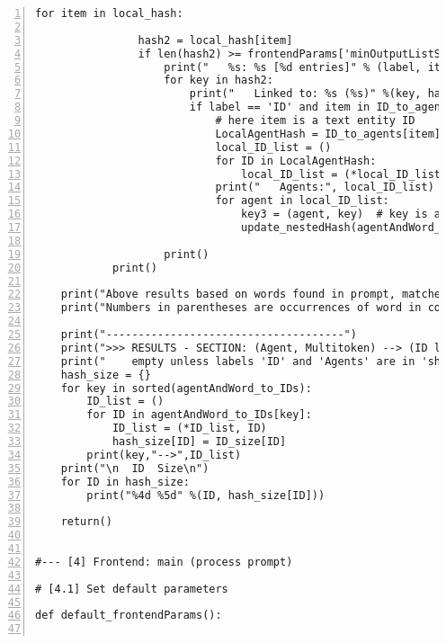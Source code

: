 \documentclass[10pt]{article}
\begin{document}
{\begin{lstlisting}[numbers=left,basicstyle=\ttfamily\footnotesize]
            for item in local_hash:

                hash2 = local_hash[item]
                if len(hash2) >= frontendParams['minOutputListSize']:
                    print("   %s: %s [%d entries]" % (label, item, len(hash2))) 
                    for key in hash2:
                        print("   Linked to: %s (%s)" %(key, hash2[key]))
                        if label == 'ID' and item in ID_to_agents: 
                            # here item is a text entity ID
                            LocalAgentHash = ID_to_agents[item]
                            local_ID_list = ()
                            for ID in LocalAgentHash:
                                local_ID_list = (*local_ID_list, ID)
                            print("   Agents:", local_ID_list)
                            for agent in local_ID_list: 
                                key3 = (agent, key)  # key is a multitoken
                                update_nestedHash(agentAndWord_to_IDs, key3, item) 

                    print()
            print()

    print("Above results based on words found in prompt, matched back to backend tables.") 
    print("Numbers in parentheses are occurrences of word in corpus.\n") 

    print("-------------------------------------")
    print(">>> RESULTS - SECTION: (Agent, Multitoken) --> (ID list)")
    print("    empty unless labels 'ID' and 'Agents' are in 'show'.\n")
    hash_size = {}
    for key in sorted(agentAndWord_to_IDs):
        ID_list = ()
        for ID in agentAndWord_to_IDs[key]:
            ID_list = (*ID_list, ID)
            hash_size[ID] = ID_size[ID]
        print(key,"-->",ID_list)
    print("\n  ID  Size\n")
    for ID in hash_size:
        print("%4d %5d" %(ID, hash_size[ID]))

    return()


#--- [4] Frontend: main (process prompt)

# [4.1] Set default parameters

def default_frontendParams():


\end{lstlisting}}
\end{document}
